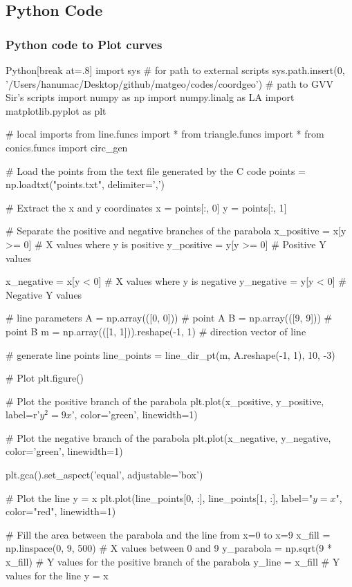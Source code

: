 \documentclass{beamer}
\theoremstyle{remark}
\numberwithin{equation}{section}
\begin{document}
\subsection{Python Code}
\begin{frame}
  \frametitle{Python code to Plot curves}
  \begin{mintedbox}{Python}[break at=.8\textheight]
import sys  # for path to external scripts
sys.path.insert(0, '/Users/hanumac/Desktop/github/matgeo/codes/coordgeo')  # path to GVV Sir's scripts
import numpy as np
import numpy.linalg as LA
import matplotlib.pyplot as plt

# local imports
from line.funcs import *
from triangle.funcs import *
from conics.funcs import circ_gen

# Load the points from the text file generated by the C code
points = np.loadtxt("points.txt", delimiter=',')

# Extract the x and y coordinates
x = points[:, 0]
y = points[:, 1]

# Separate the positive and negative branches of the parabola
x_positive = x[y >= 0]  # X values where y is positive
y_positive = y[y >= 0]  # Positive Y values

x_negative = x[y < 0]   # X values where y is negative
y_negative = y[y < 0]   # Negative Y values

# line parameters
A = np.array(([0, 0]))  # point A
B = np.array(([9, 9]))  # point B
m = np.array(([1, 1])).reshape(-1, 1)  # direction vector of line

# generate line points
line_points = line_dir_pt(m, A.reshape(-1, 1), 10, -3)

# Plot
plt.figure()

# Plot the positive branch of the parabola
plt.plot(x_positive, y_positive, label=r'$y^2 = 9x$', color='green', linewidth=1)

# Plot the negative branch of the parabola
plt.plot(x_negative, y_negative, color='green', linewidth=1)

plt.gca().set_aspect('equal', adjustable='box')

# Plot the line y = x
plt.plot(line_points[0, :], line_points[1, :], label="$ y = x $", color="red", linewidth=1)

# Fill the area between the parabola and the line from x=0 to x=9
x_fill = np.linspace(0, 9, 500)  # X values between 0 and 9
y_parabola = np.sqrt(9 * x_fill)  # Y values for the positive branch of the parabola
y_line = x_fill  # Y values for the line y = x


\end{mintedbox}
\end{frame}
\end{document}
